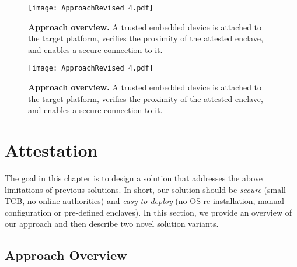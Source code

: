 

\ifusenix
\begin{figure}[t]
 \centering
  \texttt{[image: ApproachRevised\_4.pdf]}
 \caption{\textbf{Approach overview.} A trusted embedded device \device is attached to the target platform, verifies the proximity of the attested enclave, and enables a secure connection to it.}
 \vspace{-15px}
 \label{fig:approach}
\end{figure}

\else

\begin{figure}[t]
 \centering
  \texttt{[image: ApproachRevised\_4.pdf]}
 \caption{\textbf{Approach overview.} A trusted embedded device \device is attached to the target platform, verifies the proximity of the attested enclave, and enables a secure connection to it.}
 \label{fig:approach}
\end{figure}
\fi

\section{\name Attestation}
\label{sec:ourApproach}

The goal in this chapter is to design a solution that addresses the above limitations of previous solutions. In short, our solution should be \emph{secure} (small TCB, no online authorities) and \emph{easy to deploy} (no OS re-installation, manual configuration or pre-defined enclaves). In this section, we provide an overview of our approach and then describe two novel solution variants.


\subsection{Approach Overview}

